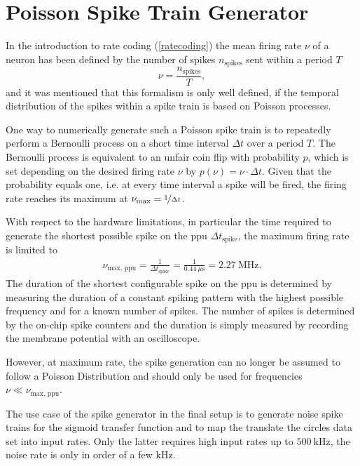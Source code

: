 \section{Poisson Spike Train Generator}
\label{poissonspiketrains}
In the introduction to rate coding (\cref{ratecoding}) the mean firing rate $\nu$ of a neuron has been defined by the number of spikes $n_\text{spikes}$ sent within a period $T$
\begin{equation*}
\nu = \frac{n_\text{spikes}}{T},
\end{equation*}
and it was mentioned that this formalism is only well defined, if the temporal distribution of the spikes within a spike train is based on Poisson processes.

One way to numerically generate such a Poisson spike train is to repeatedly perform a Bernoulli process on a short time interval $\Delta t$ over a period $T$. The Bernoulli process is equivalent to an unfair coin flip with probability $p$, which is set depending on the desired firing rate $\nu$ by $p(\nu) = \nu \cdot \Delta t$. Given that the probability equals one, i.e. at every time interval a spike will be fired, the firing rate reaches its maximum at $\nu_\text{max} = \nicefrac{1}{\Delta t}$.

With respect to the hardware limitations, in particular the time required to generate the shortest possible spike on the \gls{ppu} $\Delta t_\text{spike}$, the maximum firing rate is limited to 
\begin{align*}
\nu_\text{max, ppu} = \frac{1}{\Delta t_\text{spike}} = \frac{1}{\SI{0.44}{\mu \s}} = \SI{2.27}{\mega \Hz}.
\end{align*}
The duration of the shortest configurable spike on the \gls{ppu} is determined by measuring the duration of a constant spiking pattern with the highest possible frequency and for a known number of spikes. The number of spikes is determined by the on-chip spike counters and the duration is simply measured by recording the membrane potential with an oscilloscope.

However, at maximum rate, the spike generation can no longer be assumed to follow a Poisson Distribution and should only be used for frequencies $\nu \ll \nu_\text{max, ppu}$.

The use case of the spike generator in the final setup is to generate noise spike trains for the sigmoid transfer function and to map the translate the circles data set into input rates. Only the latter requires high input rates up to $\SI{500}{\kilo \Hz}$, the noise rate is only in order of a few $\si{\kilo \Hz}$.

